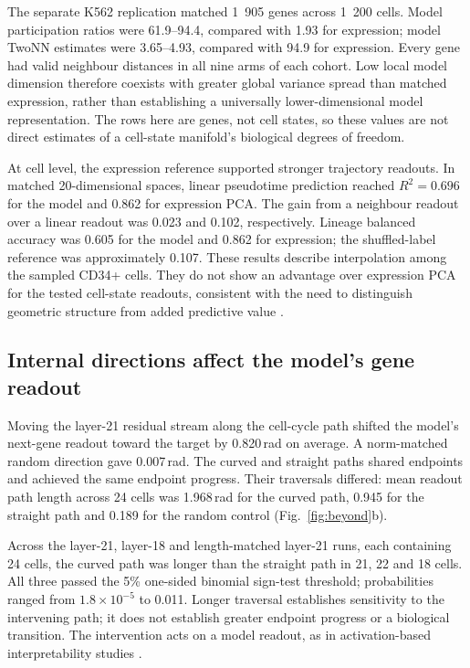 \documentclass[review,authoryear,12pt]{elsarticle}
\begin{document}
The separate K562 replication matched 1~905 genes across 1~200 cells. Model participation ratios
were 61.9--94.4, compared with 1.93 for expression; model TwoNN estimates were 3.65--4.93,
compared with 94.9 for expression. Every gene had valid neighbour distances in all nine arms of
each cohort. Low local model dimension therefore coexists with greater global variance spread
than matched expression, rather than establishing a universally lower-dimensional model
representation. The rows here are genes, not cell states, so these values are not direct estimates
of a cell-state manifold's biological degrees of freedom.

At cell level, the expression reference supported stronger trajectory readouts. In matched
20-dimensional spaces, linear pseudotime prediction reached $R^2=0.696$ for the model and 0.862
for expression PCA. The gain from a neighbour readout over a linear readout was 0.023 and 0.102,
respectively. Lineage balanced accuracy was 0.605 for the model and 0.862 for expression; the
shuffled-label reference was approximately 0.107. These results describe interpolation among the
sampled CD34+ cells. They do not show an advantage over expression PCA for the tested cell-state
readouts, consistent with the need to distinguish geometric structure from added predictive value
\citep{ref12,ref37}.

\subsection{Internal directions affect the model's gene readout}
\label{sec:steering}
Moving the layer-21 residual stream along the cell-cycle path shifted the model's next-gene readout
toward the target by 0.820\,rad on average. A norm-matched random direction gave 0.007\,rad.
The curved and straight paths shared endpoints and achieved the same endpoint progress.
Their traversals differed: mean readout path length across 24 cells was 1.968\,rad for the curved
path, 0.945 for the straight path and 0.189 for the random control (Fig.~\ref{fig:beyond}b).

Across the layer-21, layer-18 and length-matched layer-21 runs, each containing 24 cells, the curved
path was longer than the straight path in 21, 22 and 18 cells. All three passed the 5\% one-sided
binomial sign-test threshold; probabilities ranged from $1.8\times10^{-5}$ to 0.011.
Longer traversal establishes sensitivity to the intervening path; it does not establish greater
endpoint progress or a biological transition. The intervention acts on a model readout, as in
activation-based interpretability studies \citep{ref17,ref18,ref19}.
\end{document}
